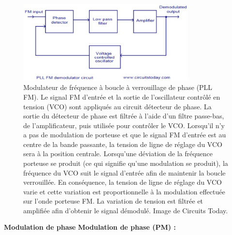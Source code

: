 \begin{figure}[H] %
    \centering
    \includegraphics[width=0.8\textwidth]{figures/6-38.jpg}
    \caption{Modulateur de fréquence à boucle à verrouillage de phase (PLL FM). Le signal FM d'entrée et la sortie de l'oscillateur contrôlé en tension (VCO) sont appliqués au circuit détecteur de phase. La sortie du détecteur de phase est filtrée à l'aide d'un filtre passe-bas, de l'amplificateur, puis utilisée pour contrôler le VCO. Lorsqu'il n'y a pas de modulation de porteuse et que le signal FM d'entrée est au centre de la bande passante, la tension de ligne de réglage du VCO sera à la position centrale. Lorsqu'une déviation de la fréquence porteuse se produit (ce qui signifie qu'une modulation se produit), la fréquence du VCO suit le signal d'entrée afin de maintenir la boucle verrouillée. En conséquence, la tension de ligne de réglage du VCO varie et cette variation est proportionnelle à la modulation effectuée sur l'onde porteuse FM. La variation de tension est filtrée et amplifiée afin d'obtenir le signal démodulé. Image de Circuits Today.}
    \label{fig:communication2}
\end{figure}
\textbf{Modulation de phase}
\textbf{Modulation de phase (PM) :}
